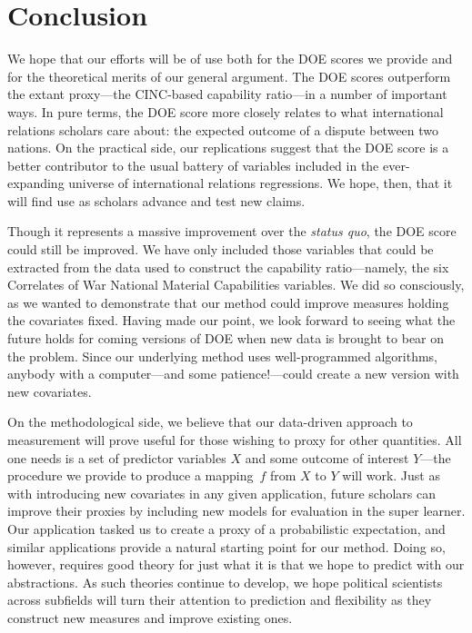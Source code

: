
\section{Conclusion}
\label{sec:conclusion}

We hope that our efforts will be of use both for the DOE scores we provide and for the theoretical merits of our general argument.
The DOE scores outperform the extant proxy---the CINC-based capability ratio---in a number of important ways.
In pure terms, the DOE score more closely relates to what international relations scholars care about: the expected outcome of a dispute between two nations.
On the practical side, our replications suggest that the DOE score is a better contributor to the usual battery of variables included in the ever-expanding universe of international relations regressions.
We hope, then, that it will find use as scholars advance and test new claims.

Though it represents a massive improvement over the \emph{status quo}, the DOE score could still be improved.
We have only included those variables that could be extracted from the data used to construct the capability ratio---namely, the six Correlates of War National Material Capabilities variables.
We did so consciously, as we wanted to demonstrate that our method could improve measures holding the covariates fixed.
Having made our point, we look forward to seeing what the future holds for coming versions of DOE when new data is brought to bear on the problem.
Since our underlying method uses well-programmed algorithms, anybody with a computer---and some patience!---could create a new version with new covariates.

On the methodological side, we believe that our data-driven approach to measurement will prove useful for those wishing to proxy for other quantities.
All one needs is a set of predictor variables $X$ and some outcome of interest $Y$---the procedure we provide to produce a mapping~$f$ from $X$ to $Y$ will work.
Just as with introducing new covariates in any given application, future scholars can improve their proxies by including new models for evaluation in the super learner.
Our application tasked us to create a proxy of a probabilistic expectation, and similar applications provide a natural starting point for our method.
Doing so, however, requires good theory for just what it is that we hope to predict with our abstractions. 
As such theories continue to develop, we hope political scientists across subfields will turn their attention to prediction and flexibility as they construct new measures and improve existing ones.

